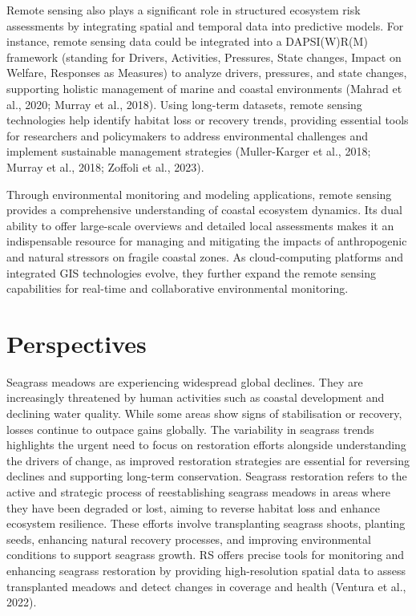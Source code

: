 \documentclass[
  letterpaper,
  11pt,
  english,
  singlespacing,
  headsepline]{MastersDoctoralThesis}
\begin{document}
\begin{spacing}{1.5}
Remote sensing also plays a significant role in structured ecosystem
risk assessments by integrating spatial and temporal data into
predictive models. For instance, remote sensing data could be integrated
into a DAPSI(W)R(M) framework (standing for Drivers, Activities,
Pressures, State changes, Impact on Welfare, Responses as Measures) to
analyze drivers, pressures, and state changes, supporting holistic
management of marine and coastal environments (Mahrad et al., 2020;
Murray et al., 2018). Using long-term datasets, remote sensing
technologies help identify habitat loss or recovery trends, providing
essential tools for researchers and policymakers to address
environmental challenges and implement sustainable management strategies
(Muller-Karger et al., 2018; Murray et al., 2018; Zoffoli et al., 2023).

Through environmental monitoring and modeling applications, remote
sensing provides a comprehensive understanding of coastal ecosystem
dynamics. Its dual ability to offer large-scale overviews and detailed
local assessments makes it an indispensable resource for managing and
mitigating the impacts of anthropogenic and natural stressors on fragile
coastal zones. As cloud-computing platforms and integrated GIS
technologies evolve, they further expand the remote sensing capabilities
for real-time and collaborative environmental monitoring.

\section{Perspectives}\label{perspectives}

Seagrass meadows are experiencing widespread global declines. They are
increasingly threatened by human activities such as coastal development
and declining water quality. While some areas show signs of
stabilisation or recovery, losses continue to outpace gains globally.
The variability in seagrass trends highlights the urgent need to focus
on restoration efforts alongside understanding the drivers of change, as
improved restoration strategies are essential for reversing declines and
supporting long-term conservation. Seagrass restoration refers to the
active and strategic process of reestablishing seagrass meadows in areas
where they have been degraded or lost, aiming to reverse habitat loss
and enhance ecosystem resilience. These efforts involve transplanting
seagrass shoots, planting seeds, enhancing natural recovery processes,
and improving environmental conditions to support seagrass growth. RS
offers precise tools for monitoring and enhancing seagrass restoration
by providing high-resolution spatial data to assess transplanted meadows
and detect changes in coverage and health (Ventura et al., 2022).


\end{spacing}
\end{document}
